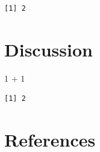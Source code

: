 \documentclass[
  letterpaper,
  DIV=11,
  numbers=noendperiod]{scrreprt}
\newenvironment{Shaded}{\begin{snugshade}}{\end{snugshade}}
\newcommand{\DecValTok}[1]{\textcolor[rgb]{0.68,0.00,0.00}{#1}}
\newcommand{\SpecialCharTok}[1]{\textcolor[rgb]{0.37,0.37,0.37}{#1}}
\begin{document}
\begin{verbatim}
[1] 2
\end{verbatim}


\chapter{Discussion}\label{discussion}

\begin{Shaded}
\begin{Highlighting}[]
\DecValTok{1} \SpecialCharTok{+} \DecValTok{1}
\end{Highlighting}
\end{Shaded}

\begin{verbatim}
[1] 2
\end{verbatim}


\chapter*{References}\label{references}

\end{document}
